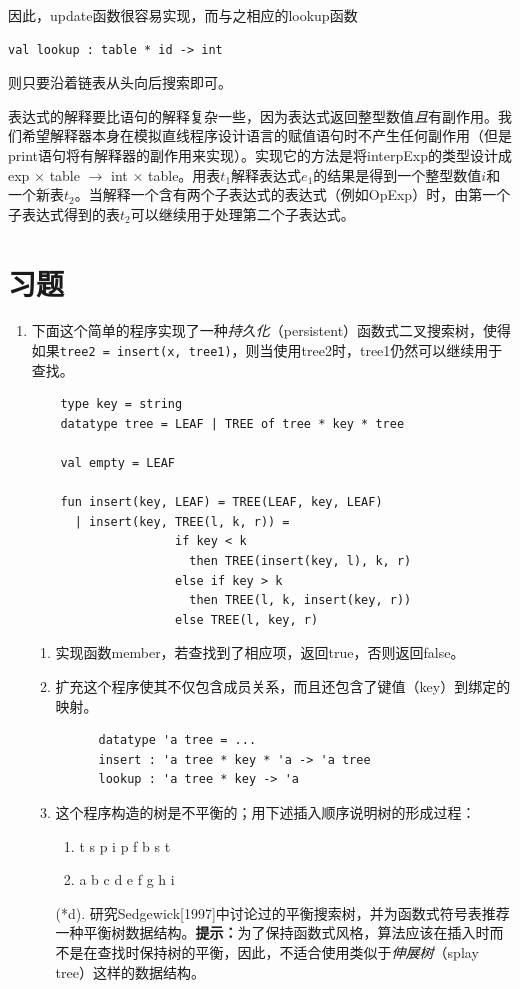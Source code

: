 \documentclass[cn,11pt,chinese]{elegantbook}
\begin{document}
因此，update函数很容易实现，而与之相应的lookup函数

\begin{verbatim}
val lookup : table * id -> int
\end{verbatim}

则只要沿着链表从头向后搜索即可。

表达式的解释要比语句的解释复杂一些，因为表达式返回整型数值\textit{且}有副作用。我们希望解释器本身在模拟直线程序设计语言的赋值语句时不产生任何副作用（但是print语句将有解释器的副作用来实现）。实现它的方法是将interpExp的类型设计成exp $\times$ table $\rightarrow$ int $\times$ table。用表$t_1$解释表达式$e_1$的结果是得到一个整型数值$i$和一个新表$t_2$。当解释一个含有两个子表达式的表达式（例如OpExp）时，由第一个子表达式得到的表$t_2$可以继续用于处理第二个子表达式。

\section{习题}

\begin{enumerate}
  \item 下面这个简单的程序实现了一种\textit{持久化}（persistent）函数式二叉搜索树，使得如果\texttt{tree2 = insert(x, tree1)}，则当使用tree2时，tree1仍然可以继续用于查找。
  \begin{verbatim}
    type key = string
    datatype tree = LEAF | TREE of tree * key * tree

    val empty = LEAF

    fun insert(key, LEAF) = TREE(LEAF, key, LEAF)
      | insert(key, TREE(l, k, r)) =
                    if key < k
                      then TREE(insert(key, l), k, r)
                    else if key > k
                      then TREE(l, k, insert(key, r))
                    else TREE(l, key, r)
  \end{verbatim}
  \begin{enumerate}
    \item 实现函数member，若查找到了相应项，返回true，否则返回false。
    \item 扩充这个程序使其不仅包含成员关系，而且还包含了键值（key）到绑定的映射。
    \begin{verbatim}
      datatype 'a tree = ...
      insert : 'a tree * key * 'a -> 'a tree
      lookup : 'a tree * key -> 'a
    \end{verbatim}
    \item 这个程序构造的树是不平衡的；用下述插入顺序说明树的形成过程：
    \begin{enumerate}
      \item t s p i p f b s t
      \item a b c d e f g h i
    \end{enumerate}
    \item [\textcolor{myblue}{(*d).}] 研究Sedgewick[1997]中讨论过的平衡搜索树，并为函数式符号表推荐一种平衡树数据结构。\textbf{提示：}为了保持函数式风格，算法应该在插入时而不是在查找时保持树的平衡，因此，不适合使用类似于\textit{伸展树}（splay tree）这样的数据结构。
  \end{enumerate}
\end{enumerate}
\end{document}
